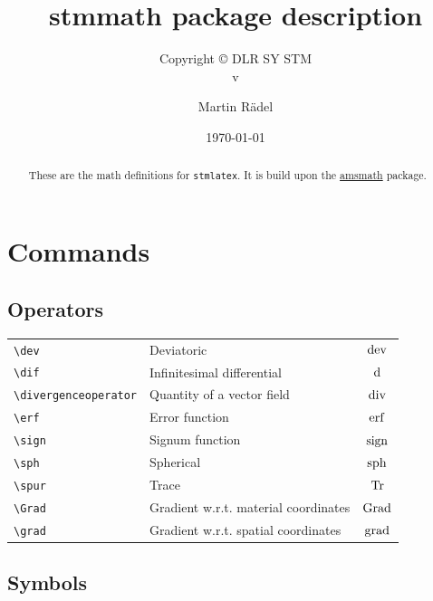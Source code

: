 \documentclass[%
  type=article,%
  layout=koma,%
  date=true,%
  hyperref=true,%
  listings=true,%
  stmmath=true,%
]{stmtext}
\author{Martin R\"{a}del}
\title{stmmath package description}
\subtitle{Copyright \copyright{} \the\year{} DLR SY STM\\v\formatdate[versiondatestyle]{\DTMToday}}
\date{\today}
\begin{document}
\maketitle

\begin{abstract}
These are the math definitions for \texttt{stmlatex}. It is build upon the \href{https://ctan.org/pkg/amsmath}{amsmath} package.
\end{abstract}

\tableofcontents

\section{Commands}

\subsection{Operators}

\begin{tabularx}{\linewidth}{lXc}
\verb+\dev+ & Deviatoric & $\operatorname{dev}$\\
\verb+\dif+ & Infinitesimal differential & $\mathop{}\!\mathrm{d}$\\
\verb+\divergenceoperator+ & Quantity of a vector field & $\operatorname{div}$\\
\verb+\erf+ & Error function & $\operatorname{erf}$\\
\verb+\sign+ & Signum function & $\operatorname{sign}$\\
\verb+\sph+ & Spherical & $\operatorname{sph}$\\
\verb+\spur+ & Trace & $\operatorname{Tr}$\\
\verb+\Grad+ & Gradient w.r.t. material coordinates & $\operatorname{Grad}$\\
\verb+\grad+ & Gradient w.r.t. spatial coordinates & $\operatorname{grad}$
\end{tabularx}

\subsection{Symbols}
\end{document}
